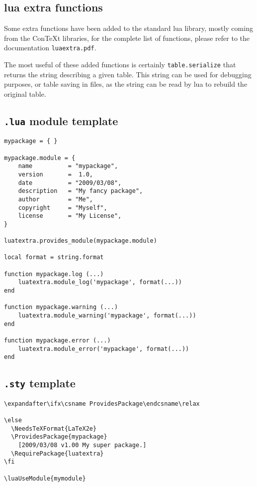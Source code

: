 \documentclass{article}
\begin{document}
\subsection{lua extra functions}

Some extra functions have been added to the standard lua library, mostly
coming from the Con\TeX t libraries, for the complete list of functions,
please refer to the documentation \texttt{luaextra.pdf}.

The most useful of these added functions is certainly \texttt{table.serialize}
that returns the string describing a given table. This string can be used for
debugging purposes, or table saving in files, as the string can be read by lua
to rebuild the original table.

\subsection{\texttt{.lua} module template\label{sub:luatemplate}}

\begin{verbatim}
mypackage = { }

mypackage.module = {
    name          = "mypackage",
    version       =  1.0,
    date          = "2009/03/08",
    description   = "My fancy package",
    author        = "Me",
    copyright     = "Myself",
    license       = "My License",
}

luatextra.provides_module(mypackage.module)

local format = string.format

function mypackage.log (...)
    luatextra.module_log('mypackage', format(...))
end

function mypackage.warning (...)
    luatextra.module_warning('mypackage', format(...))
end

function mypackage.error (...)
    luatextra.module_error('mypackage', format(...))
end
\end{verbatim}

\subsection{\texttt{.sty} template}

\begin{verbatim}
\expandafter\ifx\csname ProvidesPackage\endcsname\relax
  
\else
  \NeedsTeXFormat{LaTeX2e}
  \ProvidesPackage{mypackage}
    [2009/03/08 v1.00 My super package.]
  \RequirePackage{luatextra}
\fi

\luaUseModule{mymodule}
\end{verbatim}
\end{document}
